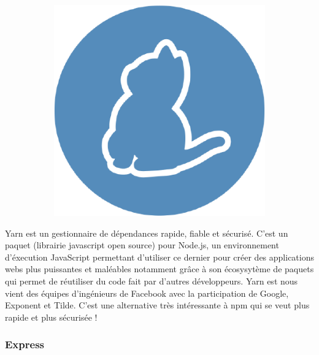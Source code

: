 \documentclass{article}
\begin{document}
\begin{figure}[h!]
	\centering
  	\begin{subfigure}[b]{0.2\linewidth}
    \includegraphics[width=\linewidth]{yarn.png}
  	\end{subfigure}
\end{figure}

Yarn est un gestionnaire de dépendances rapide, fiable et sécurisé. C'est un paquet (librairie javascript open source) pour Node.js, un environnement d'éxecution JavaScript permettant d'utiliser ce dernier pour créer des applications webs plus puissantes et maléables notamment grâce à son écosysytème de paquets qui permet de réutiliser du code fait par d'autres développeurs.
Yarn est nous vient des équipes d'ingénieurs de Facebook avec la participation de Google, Exponent et Tilde. C'est une alternative très intéressante à npm qui se veut plus rapide et plus sécurisée !


\subsubsection{Express}
\end{document}
